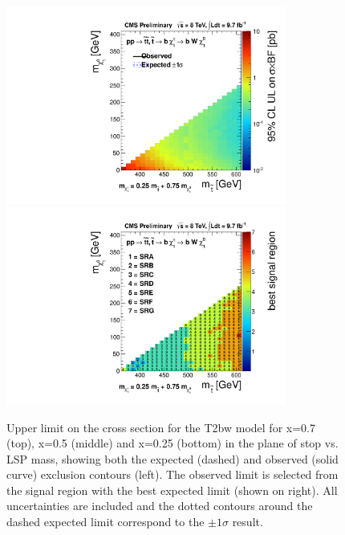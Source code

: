 \begin{figure}[hbt]
\begin{center}
       \includegraphics[height=6.5cm]{plots/combinePlots_T2bw_x25.pdf}%
       \includegraphics[height=6.5cm]{plots/combinePlots_T2bw_x25_bestSignalRegion.pdf}
    \caption{Upper limit on the cross section for the T2bw model for
      x=0.7 (top), x=0.5 (middle) and x=0.25 (bottom) in
      the plane of stop vs. LSP mass, showing
      both the expected (dashed) and observed (solid curve) exclusion
      contours (left). The observed
      limit is selected from the signal region with the best expected
      limit (shown on right). All uncertainties are included and the
      dotted contours around the dashed expected limit correspond to
      the $\pm 1\sigma$ result.}
\label{fig:comblimitT2bw}
      \end{center}
\end{figure}

\clearpage
